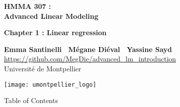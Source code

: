 \documentclass[unknownkeysallowed]{beamer}
\begin{document}



\begin{frame}
\bigskip
\bigskip
\begin{center}{
\LARGE\color{marron}
\textbf{HMMA 307 : \\ Advanced Linear Modeling}
\textbf{ }\\
\vspace{0.5cm}
}

\color{marron}
\textbf{Chapter 1 : Linear regression}
\end{center}

\vspace{0.5cm}

\begin{center}
\textbf{Emma Santinelli \ Mégane Diéval \ Yassine Sayd} \\
\vspace{0.1cm}
\url{https://github.com/MegDie/advanced_lm_introduction}\\
\vspace{0.5cm}
Université de Montpellier \\
\end{center}

\centering
\texttt{[image: umontpellier\_logo]}

\end{frame}






\begin{frame}{Table of Contents}
\tableofcontents[hideallsubsections]
\end{frame}
\end{document}
